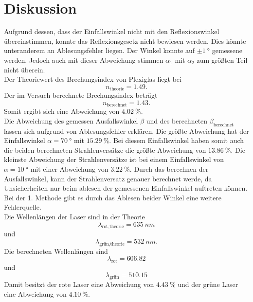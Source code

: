 \section{Diskussion}
\label{sec:Diskussion}

Aufgrund dessen, dass der Einfallswinkel nicht mit den Reflexionswinkel übereinstimmen,
konnte das Reflexionsgesetz nicht bewiesen werden. 
Dies könnte unteranderem an Ablesungsfehler liegen.
Der Winkel konnte auf $\pm \qty{1}{°}$ gemessene werden. Jedoch auch mit dieser Abweichung
stimmen $\alpha_1$ mit $\alpha_2$ zum größten Teil nicht überein.\\


\noindent Der Theoriewert des Brechungsindex von Plexiglas liegt bei
\begin{equation*}
    n_\text{theorie} = 1.49.
\end{equation*}
Der im Versuch berechnete Brechungsindex beträgt
\begin{equation*}
    n_\text{berechnet} = 1.43.
\end{equation*}
Somit ergibt sich eine Abweichung von $\qty{4.02}{\%}$. \\

\noindent Die Abweichung des gemessen Ausfallswinkel $\beta$ und des berechneten $\beta_\text{berechnet}$ 
lassen sich aufgrund von Ablesungsfehler erklären. 
Die größte Abweichung hat der Einfallswinkel $\alpha = \qty{70}{°}$ mit $\qty{15.29}{\%}$.
Bei diesem Einfallswinkel haben somit auch die beiden berechneten Strahlenversätze die größte Abweichung von 
$\qty{13.86}{\%}$.
Die kleinste Abweichung der Strahlenversätze ist bei einem Einfallswinkel von $\alpha = \qty{10}{°}$ mit einer Abweichung von $\qty{3.22}{\%}$.
Durch das berechnen der Ausfallswinkel, kann der Strahlenversatz genauer berechnet werde, da Unsicherheiten nur beim ablesen 
der gemessenen Einfallswinkel auftreten können.
Bei der 1. Methode gibt es durch das Ablesen beider Winkel eine weitere Fehlerquelle.\\

\noindent Die Wellenlängen der Laser sind in der Theorie
\begin{equation*}
    \lambda_\text{rot,theorie} = \qty{635}{nm}
\end{equation*}
und
\begin{equation*}
    \lambda_\text{grün,theorie} = \qty{532}{nm}.
\end{equation*}
Die berechneten Wellenlängen sind
\begin{equation*}
    \lambda_\text{rot} = 606.82
  \end{equation*}
  und 
  \begin{equation*}
    \lambda_\text{grün} = 510.15
  \end{equation*}
  Damit besitzt der rote Laser eine Abweichung von $\qty{4.43}{\%}$ und der grüne 
  Laser eine Abweichung von $\qty{4.10}{\%}$.